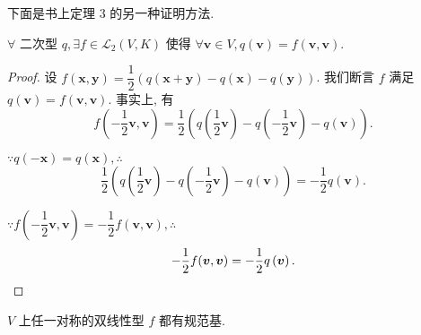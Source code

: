 \documentclass[color=black,device=normal,lang=cn,mode=geye]{elegantnote}
\begin{document}
下面是书上定理 3 的另一种证明方法.
\begin{theorem}[书上的定理 3]
    $\forall$ 二次型 $q,\exists f\in\mathcal{L}_2(V,K)$ 使得 $\forall\boldsymbol{v}\in V,q(\boldsymbol{v})=f(\boldsymbol{v},\boldsymbol{v})$.
\end{theorem}
\begin{proof}
    设 $f(\boldsymbol{x},\boldsymbol{y})=\dfrac{1}{2}(q(\boldsymbol{x}+\boldsymbol{y})-q(\boldsymbol{x})-q(\boldsymbol{y}))$. 我们断言 $f$ 满足 $q(\boldsymbol{v})=f(\boldsymbol{v},\boldsymbol{v})$. 事实上, 有
    \[f\left(-\dfrac{1}{2}\boldsymbol{v},\boldsymbol{v}\right)=\dfrac{1}{2}\left(q\left(\dfrac{1}{2}\boldsymbol{v}\right)-q\left(-\dfrac{1}{2}\boldsymbol{v}\right)-q\left(\boldsymbol{v}\right)\right).\]

    $\because q(-\boldsymbol{x})=q(\boldsymbol{x}),\therefore$
    \[\dfrac{1}{2}\left(q\left(\dfrac{1}{2}\boldsymbol{v}\right)-q\left(-\dfrac{1}{2}\boldsymbol{v}\right)-q\left(\boldsymbol{v}\right)\right)=-\dfrac{1}{2}q\left(\boldsymbol{v}\right).\]

    $\because f\left(-\dfrac{1}{2}\boldsymbol{v},\boldsymbol{v}\right)=-\dfrac{1}{2}f(\boldsymbol{v},\boldsymbol{v}),\therefore$
    \[-\dfrac{1}{2}f(\boldsymbol{v},\boldsymbol{v})=-\dfrac{1}{2}q\left(\boldsymbol{v}\right).\qedhere\]
\end{proof}
\begin{theorem}[书上的定理 4]\label{t3.4}
    $V$ 上任一对称的双线性型 $f$ 都有规范基.
\end{theorem}
\end{document}
